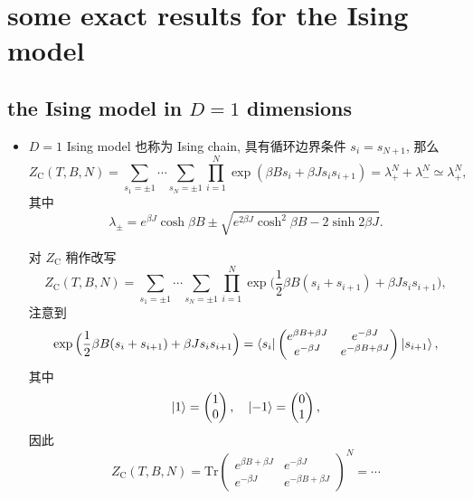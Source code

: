 \section{some exact results for the Ising model}
\subsection{the Ising model in \texorpdfstring{$D = 1$}{D=1} dimensions}
\begin{itemize}
	\item $D = 1$ Ising model 也称为 Ising chain, 具有循环边界条件 $s_i = s_{N + 1}$, 那么
	\begin{equation}
		Z_\text{C}(T, B, N) = \sum_{s_1 = \pm 1} \cdots \sum_{s_N = \pm 1} \prod_{i = 1}^N \exp(\beta B s_i + \beta J s_i s_{i + 1}) = \lambda_+^N + \lambda_-^N \simeq \lambda_+^N,
	\end{equation}
	其中
	\begin{equation}
		\lambda_\pm = e^{\beta J} \cosh \beta B \pm \sqrt{e^{2 \beta J} \cosh^2 \beta B - 2 \sinh 2 \beta J}.
	\end{equation}
	
	\begin{tcolorbox}[title=calculation:]
		对 $Z_\text{C}$ 稍作改写
		\begin{equation}
			Z_\text{C}(T, B, N) = \sum_{s_1 = \pm 1} \cdots \sum_{s_N = \pm 1} \prod_{i = 1}^N \exp \Big( \frac{1}{2} \beta B (s_i + s_{i + 1}) + \beta J s_i s_{i + 1} \Big),
		\end{equation}
		注意到
		\begin{equation}
			\exp \Big( \frac{1}{2} \beta B (s_i + s_{i + 1}) + \beta J s_i s_{i + 1} \Big) = \braket{s_i | \begin{pmatrix}
				e^{\beta B + \beta J} & e^{- \beta J} \\
				e^{- \beta J} & e^{- \beta B + \beta J}
			\end{pmatrix} | s_{i + 1}},
		\end{equation}
		其中
		\begin{equation}
			\ket{1} = \begin{pmatrix}
				1 \\
				0
			\end{pmatrix}, \quad \ket{- 1} = \begin{pmatrix}
				0 \\
				1
			\end{pmatrix},
		\end{equation}
		因此
		\begin{equation}
			Z_\text{C}(T, B, N) = \mathrm{Tr} \begin{pmatrix}
				e^{\beta B + \beta J} & e^{- \beta J} \\
				e^{- \beta J} & e^{- \beta B + \beta J}
			\end{pmatrix}^N = \cdots
		\end{equation}
	\end{tcolorbox}
	

\end{itemize}
